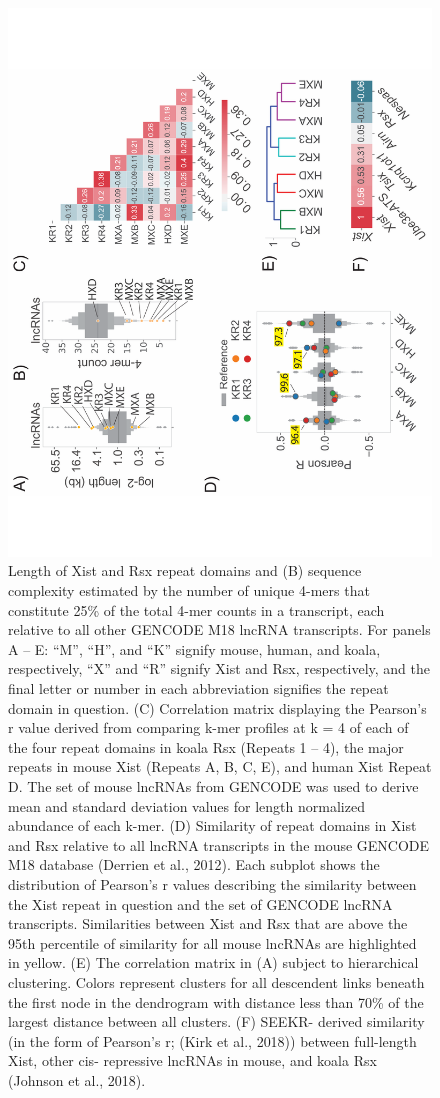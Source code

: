 \begin{figure}[!h]
\centering
\includegraphics[angle=-90,width=.8\textwidth]{images/fig2_-01.pdf}
\caption{Length of Xist and Rsx repeat domains and (B) sequence complexity estimated by the number of unique 4-mers that constitute 25\% of the total 4-mer counts in a transcript, each relative to all other GENCODE M18 lncRNA transcripts. For panels A – E: “M”, “H”, and “K” signify mouse, human, and koala, respectively, “X” and “R” signify Xist and Rsx, respectively, and the final letter or number in each abbreviation signifies the repeat domain in question. (C) Correlation matrix displaying the Pearson’s r value derived from comparing k-mer profiles at k = 4 of each of the four repeat domains in koala Rsx (Repeats 1 – 4), the major repeats in mouse Xist (Repeats A, B, C, E), and human Xist Repeat D. The set of mouse lncRNAs from GENCODE was used to derive mean and standard deviation values for length normalized abundance of each k-mer. (D) Similarity of repeat domains in Xist and Rsx relative to all lncRNA transcripts in the mouse GENCODE M18 database (Derrien et al., 2012). Each subplot shows the distribution of Pearson’s r values describing the similarity between the Xist repeat in question and the set of GENCODE lncRNA transcripts. Similarities between Xist and Rsx that are above the 95th percentile of similarity for all mouse lncRNAs are highlighted in yellow. (E) The correlation matrix in (A) subject to hierarchical clustering. Colors represent clusters for all descendent links beneath the first node in the dendrogram with distance less than 70\% of the largest distance between all clusters. (F) SEEKR- derived similarity (in the form of Pearson’s r; (Kirk et al., 2018)) between full-length Xist, other cis- repressive lncRNAs in mouse, and koala Rsx (Johnson et al., 2018).}
\end{figure}


